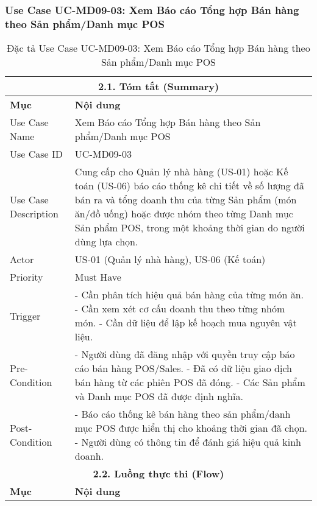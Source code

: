 \subsubsection{Use Case UC-MD09-03: Xem Báo cáo Tổng hợp Bán hàng theo Sản phẩm/Danh mục POS}
\begin{longtable}{|m{4cm}|p{11cm}|}
\caption{Đặc tả Use Case UC-MD09-03: Xem Báo cáo Tổng hợp Bán hàng theo Sản phẩm/Danh mục POS} \label{tab:uc_md09_03_corrected} \\
\hline
\multicolumn{2}{|c|}{\textbf{2.1. Tóm tắt (Summary)}} \\
\hline
\textbf{Mục} & \textbf{Nội dung} \\
\hline
\endhead %
\midrule
\endfoot %
\bottomrule
\endlastfoot %
Use Case Name & Xem Báo cáo Tổng hợp Bán hàng theo Sản phẩm/Danh mục POS \\
\hline
Use Case ID & UC-MD09-03 \\
\hline
Use Case Description & Cung cấp cho Quản lý nhà hàng (US-01) hoặc Kế toán (US-06) báo cáo thống kê chi tiết về số lượng đã bán ra và tổng doanh thu của từng Sản phẩm (món ăn/đồ uống) hoặc được nhóm theo từng Danh mục Sản phẩm POS, trong một khoảng thời gian do người dùng lựa chọn. \\
\hline
Actor & US-01 (Quản lý nhà hàng), US-06 (Kế toán) \\
\hline
Priority & Must Have \\
\hline
Trigger & - Cần phân tích hiệu quả bán hàng của từng món ăn. \newline - Cần xem xét cơ cấu doanh thu theo từng nhóm món. \newline - Cần dữ liệu để lập kế hoạch mua nguyên vật liệu. \\
\hline
Pre-Condition & - Người dùng đã đăng nhập với quyền truy cập báo cáo bán hàng POS/Sales. \newline - Đã có dữ liệu giao dịch bán hàng từ các phiên POS đã đóng. \newline - Các Sản phẩm và Danh mục POS đã được định nghĩa. \\
\hline
Post-Condition & - Báo cáo thống kê bán hàng theo sản phẩm/danh mục POS được hiển thị cho khoảng thời gian đã chọn. \newline - Người dùng có thông tin để đánh giá hiệu quả kinh doanh. \\
\hline
\multicolumn{2}{|c|}{\textbf{2.2. Luồng thực thi (Flow)}} \\
\hline
\textbf{Mục} & \textbf{Nội dung} \\

\end{longtable}

